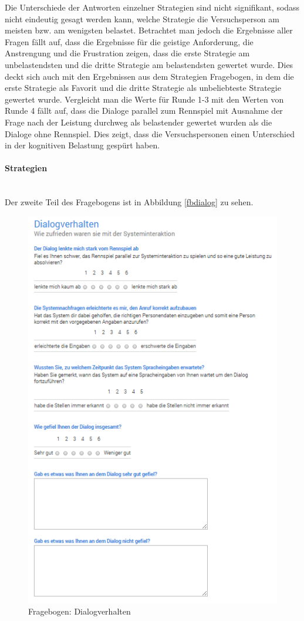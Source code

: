 \documentclass[12pt,a4paper]{scrartcl}
\begin{document}
Die Unterschiede der Antworten einzelner Strategien sind nicht signifikant, sodass nicht eindeutig gesagt werden kann, welche Strategie die Versuchsperson am meisten bzw. am wenigsten belastet. Betrachtet man jedoch die Ergebnisse aller Fragen fällt auf, dass die Ergebnisse für die geistige Anforderung, die Anstrengung und die Frustration zeigen, dass die erste Strategie am unbelastendsten und die dritte Strategie am belastendsten gewertet wurde. Dies deckt sich auch mit den Ergebnissen aus dem Strategien Fragebogen, in dem die erste Strategie als Favorit und die dritte Strategie als unbeliebteste Strategie gewertet wurde. Vergleicht man die Werte für Runde 1-3 mit den Werten von Runde 4 fällt auf, dass die Dialoge parallel zum Rennspiel mit Ausnahme der Frage nach der Leistung durchweg als belastender gewertet wurden als die Dialoge ohne Rennspiel. Dies zeigt, dass die Versuchspersonen einen Unterschied in der kognitiven Belastung gespürt haben.   
\paragraph{Strategien}
~\\
Der zweite Teil des Fragebogens ist in Abbildung \ref{fbdialog} zu sehen. 
\newline
\begin{figure}[htbp]
\begin{center}
\includegraphics[width=12cm]{fbdialog.png}
\caption{Fragebogen: Dialogverhalten}
\label{fbstrategien1}
\end{center}
\end{figure}
\end{document}
